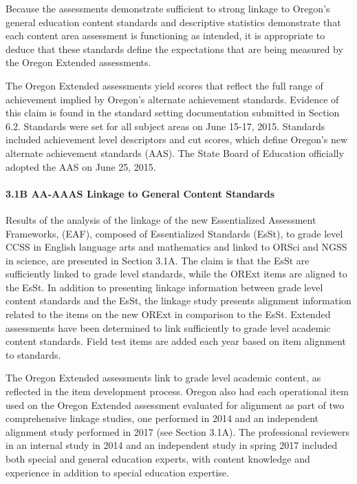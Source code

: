 \documentclass[]{article}
\let\oldparagraph\paragraph
\renewcommand{\paragraph}[1]{\oldparagraph{#1}\mbox{}}
\begin{document}
Because the assessments demonstrate sufficient to strong linkage to
Oregon's general education content standards and descriptive statistics
demonstrate that each content area assessment is functioning as
intended, it is appropriate to deduce that these standards define the
expectations that are being measured by the Oregon Extended assessments.

The Oregon Extended assessments yield scores that reflect the full range
of achievement implied by Oregon's alternate achievement standards.
Evidence of this claim is found in the standard setting documentation
submitted in Section 6.2. Standards were set for all subject areas on
June 15-17, 2015. Standards included achievement level descriptors and
cut scores, which define Oregon's new alternate achievement standards
(AAS). The State Board of Education officially adopted the AAS on June
25, 2015.

\hypertarget{b-aa-aaas-linkage-to-general-content-standards}{%
\paragraph{3.1B AA-AAAS Linkage to General Content
Standards}\label{b-aa-aaas-linkage-to-general-content-standards}}

Results of the analysis of the linkage of the new Essentialized
Assessment Frameworks, (EAF), composed of Essentialized Standards
(EsSt), to grade level CCSS in English language arts and mathematics and
linked to ORSci and NGSS in science, are presented in Section 3.1A. The
claim is that the EsSt are sufficiently linked to grade level standards,
while the ORExt items are aligned to the EsSt. In addition to presenting
linkage information between grade level content standards and the EsSt,
the linkage study presents alignment information related to the items on
the new ORExt in comparison to the EsSt. Extended assessments have been
determined to link sufficiently to grade level academic content
standards. Field test items are added each year based on item alignment
to standards.

The Oregon Extended assessments link to grade level academic content, as
reflected in the item development process. Oregon also had each
operational item used on the Oregon Extended assessment evaluated for
alignment as part of two comprehensive linkage studies, one performed in
2014 and an independent alignment study performed in 2017 (see Section
3.1A). The professional reviewers in an internal study in 2014 and an
independent study in spring 2017 included both special and general
education experts, with content knowledge and experience in addition to
special education expertise.
\end{document}
